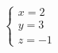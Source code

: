 \documentclass[preview]{standalone}
\begin{document}
\begin{align*}
\begin{cases} x = 2 \\ y = 3 \\ z = -1 \end{cases}
\end{align*}
\end{document}
